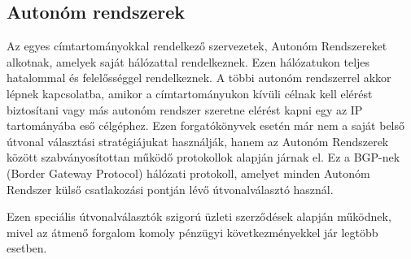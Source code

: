 \subsection{Autonóm rendszerek}

Az egyes címtartományokkal rendelkező szervezetek, Autonóm Rendszereket alkotnak, amelyek saját hálózattal rendelkeznek. Ezen hálózatukon teljes hatalommal és felelősséggel rendelkeznek. A többi autonóm rendszerrel akkor lépnek kapcsolatba, amikor a címtartományukon kívüli célnak kell elérést biztosítani vagy más autonóm rendszer szeretne elérést kapni egy az IP tartományába eső célgéphez.
Ezen forgatókönyvek esetén már nem a saját belső útvonal választási stratégiájukat használják, hanem az Autonóm Rendszerek között szabványosítottan működő protokollok alapján járnak el. Ez a BGP-nek (Border Gateway Protocol) hálózati protokoll, amelyet minden Autonóm Rendszer külső csatlakozási pontján lévő útvonalválasztó használ. 

Ezen speciális útvonalválasztók szigorú üzleti szerződések alapján működnek, mivel az átmenő forgalom komoly pénzügyi következményekkel jár legtöbb esetben. 









